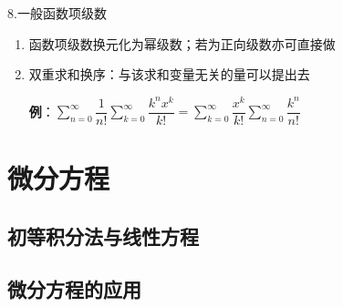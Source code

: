 \documentclass[UTF8]{ctexart}
\newcommand\no{\noindent}
\newcommand\dis{\displaystyle}
\newcommand\sumnz{\dis\sum\limits_{n=0}^{\infty}}
\newcommand\sumkz{\dis\sum\limits_{k=0}^{\infty}}
\begin{document}
\begin{spacing}{2}
\begin{enumerate}[itemindent=1.4em, label=(\arabic*)]
\end{enumerate}

\no8.一般函数项级数

\begin{enumerate}[itemindent=1.4em, label=(\arabic*)]

\item 函数项级数换元化为幂级数；若为正向级数亦可直接做

\item 双重求和换序：与该求和变量无关的量可以提出去

\textbf{例}：$\sumnz \dfrac{1}{n!}\sumkz\dfrac{k^nx^k}{k!}=
\sumkz\dfrac{x^k}{k!}\sumnz\dfrac{k^n}{n!}$

\end{enumerate}

\newpage

\section{微分方程}

\subsection{初等积分法与线性方程}

\subsection{微分方程的应用}

\end{spacing}
\end{document}
